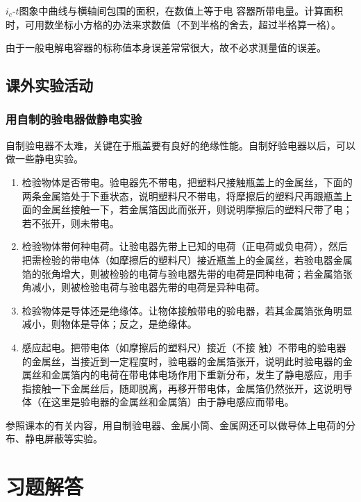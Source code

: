$i_c$-$t$图象中曲线与横轴间包围的面积，在数值上等于电
容器所带电量。计算面积时，可用数坐标小方格的办法来求数值（不到半格的舍去，超过半格算一格）。

由于一般电解电容器的标称值本身误差常常很大，故不必求测量值的误差。

\subsection{课外实验活动}
\subsubsection{用自制的验电器做静电实验}

自制验电器不太难，关键在于瓶盖要有良好的绝缘性能。自制好验电器以后，可以做一些静电实验。

\begin{enumerate}
    \item 检验物体是否带电。验电器先不带电，把塑料尺接触瓶盖上的金属丝，下面的两条金属箔处于下垂状态，说明塑料尺不带电，将摩擦后的塑料尺再跟瓶盖上面的金属丝接触一下，若金属箔因此而张开，则说明摩擦后的塑料尺带了电；若不张开，则未带电。
    \item 检验物体带何种电荷。让验电器先带上已知的电荷（正电荷或负电荷），然后把需检验的带电体（如摩擦后的塑料尺）接近瓶盖上的金属丝，若验电器金属箔的张角增大，则被检验的电荷与验电器先带的电荷是同种电荷；若金属箔张角减小，则被检验电荷与验电器先带的电荷是异种电荷。    
    \item 检验物体是导体还是绝缘体。让物体接触带电的验电器，若其金属箔张角明显减小，则物体是导体；反之，是绝缘体。
    \item 感应起电。把带电体（如摩擦后的塑料尺）接近（不接
    触）不带电的验电器的金属丝，当接近到一定程度时，验电器的金属箔张开，说明此时验电器的金属丝和金属箔内的电荷在带电体电场作用下重新分布，发生了静电感应，用手指接触一下金属丝后，随即脱离，再移开带电体，金属箔仍然张开，这说明导体（在这里是验电器的金属丝和金属箔）由于静电感应而带电。
\end{enumerate}

    参照课本的有关内容，用自制验电器、金属小筒、金属网还可以做导体上电荷的分布、静电屏蔽等实验。

\section{习题解答}
